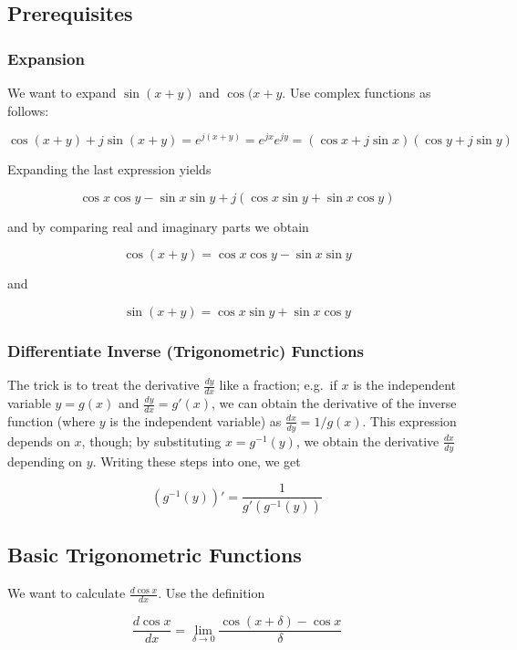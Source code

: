 

\subsection{Prerequisites}

\subsubsection{Expansion}

We want to expand $\sin(x+y)$ and $\cos(x+y$. Use complex functions as follows:

\[\cos(x+y) + j \sin(x+y) = e^{j(x+y)} = e^{jx} e^{jy} = \left( \cos x + j\sin x \right) \left( \cos y + j\sin y \right) \]

Expanding the last expression yields

\[ \cos x \cos y - \sin x \sin y + j \left( \cos x \sin y + \sin x \cos y \right) \]

and by comparing real and imaginary parts we obtain

\[\cos(x+y) = \cos x \cos y - \sin x \sin y \]

and

\[ \sin(x+y) = \cos x \sin y + \sin x \cos y \]

\subsubsection{Differentiate Inverse (Trigonometric) Functions}

The trick is to treat the derivative $\frac{dy}{dx}$ like a fraction; e.g.~if $x$ is the independent variable $y=g(x)$ and $\frac{dy}{dx} = g'(x)$, we can obtain the derivative of the inverse function (where $y$ is the independent variable) as $\frac{dx}{dy} =1 /g(x)$. This expression depends on $x$, though; by substituting $x=g^{-1}(y)$, we obtain the derivative $\frac{dx}{dy}$ depending
on $y$. Writing these steps into one, we get

\[ \left( g^{-1}(y) \right)' = \frac{1}{g'(g^{-1}(y))}\]

\subsection{Basic Trigonometric Functions}

We want to calculate $\frac{d \cos x}{dx}$. Use the definition

\[\frac{d \cos x}{dx} = \lim_{\delta \rightarrow 0} \frac{\cos(x+\delta) - \cos x}{\delta}\]

